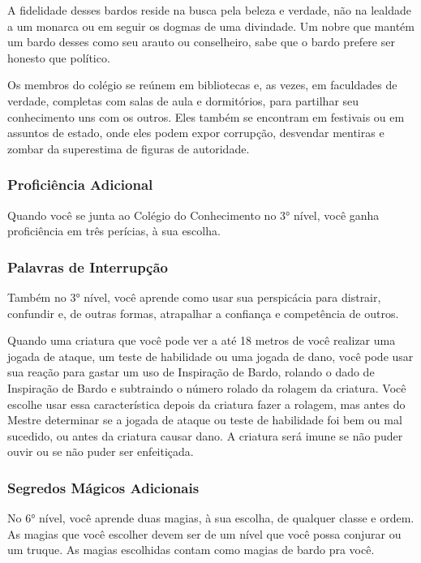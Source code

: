 \begin{multicols}{2}
A fidelidade desses bardos reside na busca pela beleza e verdade, não na
lealdade a um monarca ou em seguir os dogmas de uma divindade. Um nobre que
mantém um bardo desses como seu arauto ou conselheiro, sabe que o bardo prefere
ser honesto que político.

Os membros do colégio se reúnem em bibliotecas e, as vezes, em faculdades de
verdade, completas com salas de aula e dormitórios, para partilhar seu
conhecimento uns com os outros. Eles também se encontram em festivais ou em
assuntos de estado, onde eles podem expor corrupção, desvendar mentiras e zombar
da superestima de figuras de autoridade.

\subsubsection*{Proficiência Adicional}%

Quando você se junta ao Colégio do Conhecimento no 3° nível, você ganha
proficiência em três perícias, à sua escolha.

\subsubsection*{Palavras de Interrupção}%

Também no 3° nível, você aprende como usar sua perspicácia para distrair,
confundir e, de outras formas, atrapalhar a confiança e competência de outros.

Quando uma criatura que você pode ver a até 18 metros de você realizar uma
jogada de ataque, um teste de habilidade ou uma jogada de dano, você pode usar
sua reação para gastar um uso de Inspiração de Bardo, rolando o dado de
Inspiração de Bardo e subtraindo o número rolado da rolagem da criatura. Você
escolhe usar essa característica depois da criatura fazer a rolagem, mas antes
do Mestre determinar se a jogada de ataque ou teste de habilidade foi bem ou mal
sucedido, ou antes da criatura causar dano. A criatura será imune se não puder
ouvir ou se não puder ser enfeitiçada.

\subsubsection*{Segredos Mágicos Adicionais}%

No 6° nível, você aprende duas magias, à sua escolha, de qualquer classe e
ordem. As magias que você escolher devem ser de um nível que você possa conjurar
ou um truque. As magias escolhidas contam como magias de bardo pra você.


\end{multicols}
